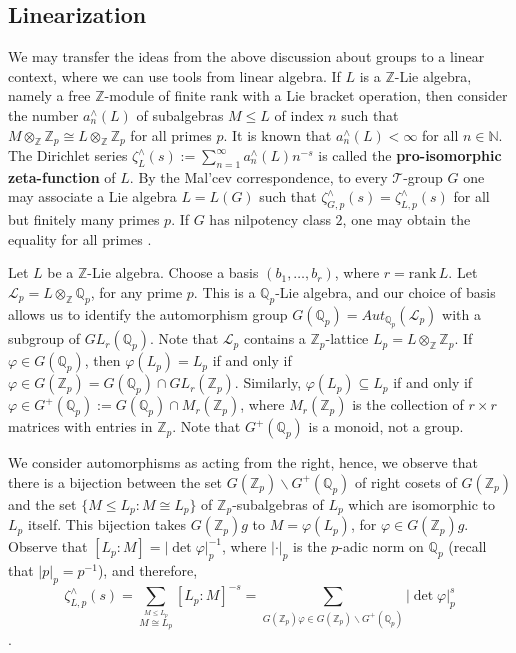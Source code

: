 \documentclass[12pt]{article}
\begin{document}
\subsection{Linearization}
We may transfer the ideas from the above discussion about groups to a linear context, where we can use tools from linear algebra.
If $L$ is a $\mathbb{Z}$-Lie algebra, namely a free $\mathbb{Z}$-module of finite rank with a Lie bracket operation, then consider the number $a_{n}^{\wedge}(L)$ of subalgebras $M\leq L$ of index $n$ such that $M\otimes_{\mathbb{Z}}\mathbb{Z}_p\cong L\otimes_{\mathbb{Z}}\mathbb{Z}_p$ for all primes $p$. It is known that $a_{n}^{\wedge}(L)<\infty$ for all $n\in\mathbb{N}$. The Dirichlet series $\zeta_{L}^{\wedge}(s):=\sum_{n=1}^{\infty}{a_{n}^{\wedge}}(L)n^{-s}$ is called the \textbf{pro-isomorphic zeta-function} of $L$. By the Mal'cev correspondence, to every $\mathcal{T}$-group $G$ one may associate a Lie algebra $L=L(G)$ such that $\zeta_{G,p}^{\wedge}(s)=\zeta_{L,p}^{\wedge}(s)$ for all but finitely many primes $p$. If $G$ has nilpotency class $2$, one may obtain the equality for all primes \cite[Theorem 4.1]{GrunewaldSegalSmith}.\par
Let $L$ be a $\mathbb{Z}$-Lie algebra. Choose a basis $(b_1,\dots,b_r)$, where $r=\mathrm{rank}\,L$. Let $\mathcal{L}_{p}=L\otimes_{\mathbb{Z}}\mathbb{Q}_p$, for any prime $p$. This is a $\mathbb{Q}_p$-Lie algebra, and our choice of basis allows us to identify the automorphism group $G(\mathbb{Q}_p)=Aut_{\mathbb{Q}_p}(\mathcal{L}_{p})$ with a subgroup of $GL_r(\mathbb{Q}_p)$. Note that $\mathcal{L}_{p}$ contains a $\mathbb{Z}_p$-lattice $L_{p}=L\otimes_{\mathbb{Z}}\mathbb{Z}_p$. If $\varphi\in G(\mathbb{Q}_p)$, then $\varphi(L_{p})=L_{p}$ if and only if $\varphi\in G(\mathbb{Z}_p)=G(\mathbb{Q}_p)\cap GL_r(\mathbb{Z}_p)$. Similarly, $\varphi(L_{p})\subseteq L_{p}$ if and only if $\varphi\in G^{+}(\mathbb{Q}_p):=G(\mathbb{Q}_p)\cap {M}_r(\mathbb{Z}_p)$, where ${M}_r(\mathbb{Z}_p)$ is the collection of $r\times r$ matrices with entries in $\mathbb{Z}_p$. Note that $G^{+}(\mathbb{Q}_p)$ is a monoid, not a group.\par
We consider automorphisms as acting from the right, hence, we observe that there is a bijection between the set $G(\mathbb{Z}_p)\backslash G^{+}(\mathbb{Q}_p)$ of right cosets of $G(\mathbb{Z}_p)$ and the set $\{M\leq L_{p} : M\cong L_{p}\}$ of $\mathbb{Z}_{p}$-subalgebras of $L_{p}$ which are isomorphic to $L_{p}$ itself. This bijection takes $G(\mathbb{Z}_p)g$ to $M=\varphi(L_{p})$, for $\varphi\in G(\mathbb{Z}_p)g$.
Observe that $[L_{p}:M]=|\det\varphi|_p^{-1}$, where $|\cdot|_p$ is the $p$-adic norm on $\mathbb{Q}_{p}$ (recall that $|p|_{p}=p^{-1}$), and therefore,
\begin{equation}
\label{eq:proisomorphic.zeta}
\zeta_{L,p}^{\wedge}(s)=\underset{\overset{\scriptscriptstyle M\leq L_{p}}{\scriptscriptstyle M\cong L_{p}}}{\sum}[L_{p}:M]^{-s}=\underset{\scriptscriptstyle G(\mathbb{Z}_p)\varphi\in G(\mathbb{Z}_p)\backslash G^{+}(\mathbb{Q}_p)}{\sum}|\det\varphi|_p^s
\end{equation}.
\end{document}
